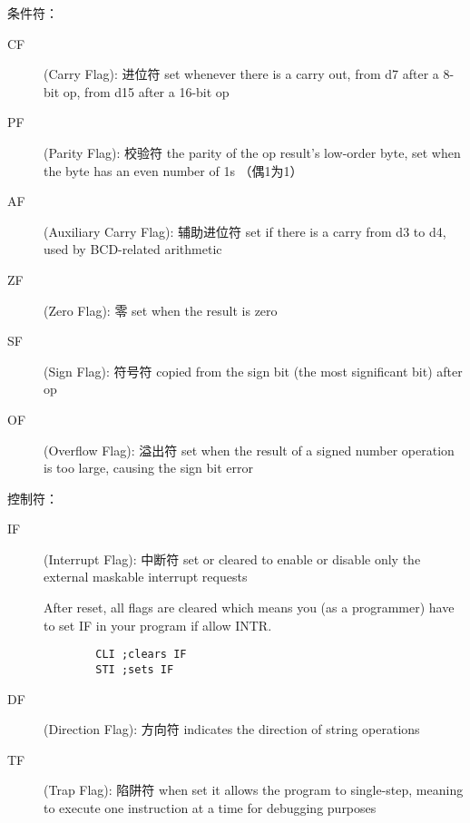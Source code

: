 条件符：
\begin{description}
	\item[CF](Carry Flag): 进位符 set whenever there is a carry out, from d7 after a 8-bit op, from d15 after a 16-bit op
	\item[PF](Parity Flag): 校验符 the parity of the op result’s low-order byte,  set when the byte has an even number of 1s （偶1为1）
	\item[AF](Auxiliary Carry Flag): 辅助进位符 set if there is a carry from d3 to d4, used by BCD-related arithmetic
	\item[ZF](Zero Flag): 零 set when the result is zero
	\item[SF](Sign Flag): 符号符 copied from the sign bit (the most significant bit) after op
	\item[OF](Overflow Flag): 溢出符 set when the result of a signed number operation is too large, causing the sign bit error
\end{description}
控制符：
\begin{description}
	\item[IF] (Interrupt Flag): 中断符 set or cleared to enable or disable only the external maskable interrupt requests
	\begin{tcolorbox}
		\scriptsize
		After reset, all flags are cleared which means you (as a programmer) have to set IF in your program if allow INTR.
	\end{tcolorbox}
	\begin{verbatim}
		CLI ;clears IF
		STI ;sets IF
	\end{verbatim}
	\item[DF] (Direction Flag): 方向符 indicates the direction of string operations
	\item[TF] (Trap Flag): 陷阱符 when set it allows the program to single-step, meaning to execute one instruction at a time for debugging purposes
\end{description}

